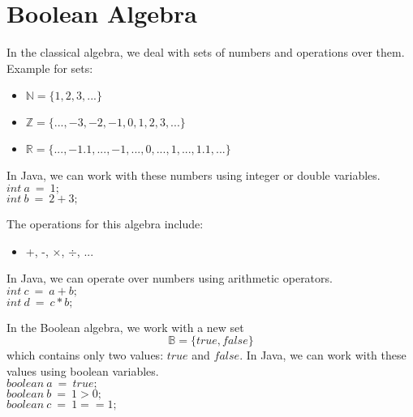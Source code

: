 \documentclass[a4paper]{article}
\begin{document}
	
	
	
	\section{Boolean Algebra}
	In the classical algebra, we deal with sets of numbers and operations over them. Example for sets:
	\begin{itemize}
		\item $\mathbb{N} = \{1, 2, 3, ...\}$
		\item $\mathbb{Z} = \{..., -3, -2, -1, 0, 1, 2, 3, ...\}$
		\item $\mathbb{R} = \{..., -1.1, ..., -1, ..., 0, ..., 1, ..., 1.1, ...\}$
	\end{itemize}

	In Java, we can work with these numbers using integer or double variables.\\
	$int\ a\ =\ 1;$\\
	$int\ b\ =\ 2 + 3;$
	
	The operations for this algebra include:
	\begin{itemize}
		\item +, -, $\times$, $\div$, ...
	\end{itemize}
	In Java, we can operate over numbers using arithmetic operators.\\
	$int\ c\ =\ a + b;$\\
	$int\ d\ =\ c * b;$\\
	
	\par
	In the Boolean algebra, we work with a new set 
	\begin{equation*}
		\mathbb{B} = \{true, false\}
	\end{equation*} which contains only two values: $true$ and $false$.
	In Java, we can work with these values using boolean variables.\\
	$boolean\ a\ =\ true;$\\
	$boolean\ b\ =\ 1 > 0;$\\
	$boolean\ c\ =\ 1 == 1;$
	
\end{document}
